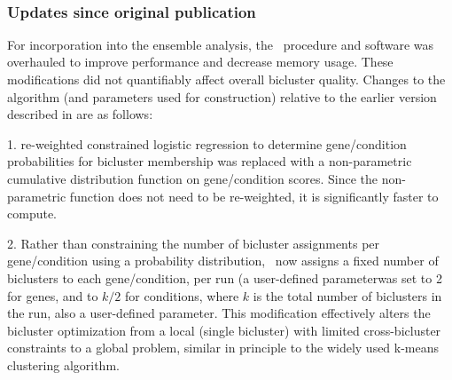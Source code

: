 \cm\ 

\DIFaddend \subsubsection{Updates since original publication}

For incorporation into the \DIFdelbegin {}\DIFdelend \DIFaddbegin \egrine\DIFadd{~}\DIFaddend ensemble analysis, the \cm\
procedure and software was overhauled to improve \DIFdelbegin {}\DIFdelend \DIFaddbegin {}\DIFaddend performance
and decrease memory usage. These modifications did not quantifiably
affect overall bicluster quality. Changes to the algorithm (and
parameters used for \DIFdelbegin {}\DIFdelend \DIFaddbegin \egrine\DIFadd{~}\DIFaddend construction) relative to the earlier
version described in \DIFdelbegin \DIFdel{(Reiss et al., 2006) }\DIFdelend \DIFaddbegin {}\DIFaddend are as follows:

1. \DIFdelbegin {}\DIFdelend \DIFaddbegin {}\DIFaddend re-weighted constrained logistic regression
to determine gene/condition probabilities for bicluster membership was
replaced with a non-parametric cumulative distribution function on
gene/condition scores. Since the non-parametric function does not need
to be re-weighted, it is significantly faster to compute.

2. Rather than constraining the number of bicluster assignments per
gene/condition using a probability distribution, \cm\DIFaddbegin \ \DIFaddend now assigns a
fixed number of biclusters to each gene/condition, per run (\DIFdelbegin \DIFdel{this is }\DIFdelend a
user-defined parameter\DIFdelbegin \DIFdel{, and for this study }\DIFdelend \DIFaddbegin {}\DIFaddend was set to 2 for genes, and
to $k/2$ for conditions, where $k$ is the total number of biclusters in
the run, also a user-defined parameter\DIFdelbegin \DIFdel{)}\DIFdelend . This modification effectively
alters the bicluster optimization from a local
\DIFaddbegin {}\DIFaddend (single bicluster) \DIFdelbegin {}\DIFdelend with limited cross-bicluster constraints \DIFdelbegin \DIFdel{, }\DIFdelend to a global problem,
similar in principle to the widely used k-means clustering algorithm.

